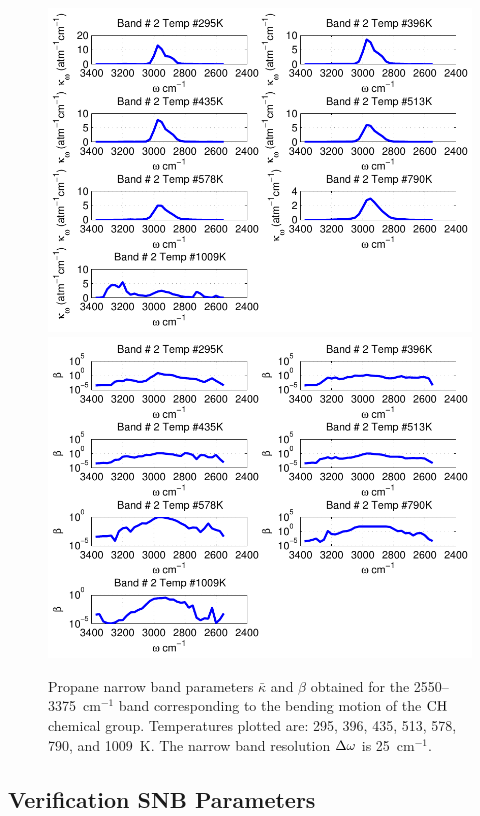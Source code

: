 \begin{figure}[p]
\begin{center}
\includegraphics[width=5.0in]{Figures/Propane_Kappa_Band2_MALKMUS.pdf}
\includegraphics[width=5.0in]{Figures/Propane_Beta_Band2_MALKMUS.pdf}
\end{center}
\caption{Propane narrow band parameters $\bar{\kappa}$ and $\beta$ obtained for the 2550--3375~cm$^{-1}$ band corresponding to the bending motion of the $\rm CH$ chemical group. Temperatures plotted are: 295, 396, 435, 513, 578, 790, and 1009~K. The narrow band resolution $\Delta \omega$ is 25~cm$^{-1}$.\label{fig:propane_kappa_beta2}}
\end{figure}

\FloatBarrier

\subsection{Verification SNB Parameters}

